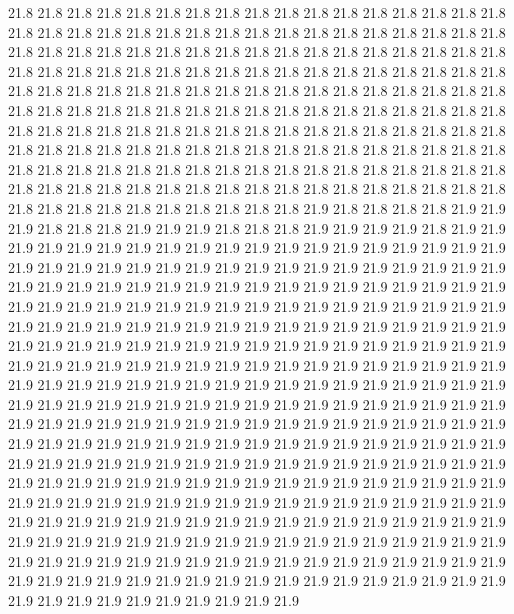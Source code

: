 21.8
21.8
21.8
21.8
21.8
21.8
21.8
21.8
21.8
21.8
21.8
21.8
21.8
21.8
21.8
21.8
21.8
21.8
21.8
21.8
21.8
21.8
21.8
21.8
21.8
21.8
21.8
21.8
21.8
21.8
21.8
21.8
21.8
21.8
21.8
21.8
21.8
21.8
21.8
21.8
21.8
21.8
21.8
21.8
21.8
21.8
21.8
21.8
21.8
21.8
21.8
21.8
21.8
21.8
21.8
21.8
21.8
21.8
21.8
21.8
21.8
21.8
21.8
21.8
21.8
21.8
21.8
21.8
21.8
21.8
21.8
21.8
21.8
21.8
21.8
21.8
21.8
21.8
21.8
21.8
21.8
21.8
21.8
21.8
21.8
21.8
21.8
21.8
21.8
21.8
21.8
21.8
21.8
21.8
21.8
21.8
21.8
21.8
21.8
21.8
21.8
21.8
21.8
21.8
21.8
21.8
21.8
21.8
21.8
21.8
21.8
21.8
21.8
21.8
21.8
21.8
21.8
21.8
21.8
21.8
21.8
21.8
21.8
21.8
21.8
21.8
21.8
21.8
21.8
21.8
21.8
21.8
21.8
21.8
21.8
21.8
21.8
21.8
21.8
21.8
21.8
21.8
21.8
21.8
21.8
21.8
21.8
21.8
21.8
21.8
21.8
21.8
21.8
21.8
21.8
21.8
21.8
21.8
21.8
21.8
21.8
21.8
21.8
21.8
21.8
21.8
21.8
21.8
21.8
21.8
21.8
21.8
21.8
21.8
21.8
21.8
21.8
21.8
21.8
21.8
21.9
21.8
21.8
21.8
21.8
21.9
21.9
21.9
21.8
21.8
21.8
21.9
21.9
21.9
21.8
21.8
21.8
21.9
21.9
21.9
21.9
21.8
21.9
21.9
21.9
21.9
21.9
21.9
21.9
21.9
21.9
21.9
21.9
21.9
21.9
21.9
21.9
21.9
21.9
21.9
21.9
21.9
21.9
21.9
21.9
21.9
21.9
21.9
21.9
21.9
21.9
21.9
21.9
21.9
21.9
21.9
21.9
21.9
21.9
21.9
21.9
21.9
21.9
21.9
21.9
21.9
21.9
21.9
21.9
21.9
21.9
21.9
21.9
21.9
21.9
21.9
21.9
21.9
21.9
21.9
21.9
21.9
21.9
21.9
21.9
21.9
21.9
21.9
21.9
21.9
21.9
21.9
21.9
21.9
21.9
21.9
21.9
21.9
21.9
21.9
21.9
21.9
21.9
21.9
21.9
21.9
21.9
21.9
21.9
21.9
21.9
21.9
21.9
21.9
21.9
21.9
21.9
21.9
21.9
21.9
21.9
21.9
21.9
21.9
21.9
21.9
21.9
21.9
21.9
21.9
21.9
21.9
21.9
21.9
21.9
21.9
21.9
21.9
21.9
21.9
21.9
21.9
21.9
21.9
21.9
21.9
21.9
21.9
21.9
21.9
21.9
21.9
21.9
21.9
21.9
21.9
21.9
21.9
21.9
21.9
21.9
21.9
21.9
21.9
21.9
21.9
21.9
21.9
21.9
21.9
21.9
21.9
21.9
21.9
21.9
21.9
21.9
21.9
21.9
21.9
21.9
21.9
21.9
21.9
21.9
21.9
21.9
21.9
21.9
21.9
21.9
21.9
21.9
21.9
21.9
21.9
21.9
21.9
21.9
21.9
21.9
21.9
21.9
21.9
21.9
21.9
21.9
21.9
21.9
21.9
21.9
21.9
21.9
21.9
21.9
21.9
21.9
21.9
21.9
21.9
21.9
21.9
21.9
21.9
21.9
21.9
21.9
21.9
21.9
21.9
21.9
21.9
21.9
21.9
21.9
21.9
21.9
21.9
21.9
21.9
21.9
21.9
21.9
21.9
21.9
21.9
21.9
21.9
21.9
21.9
21.9
21.9
21.9
21.9
21.9
21.9
21.9
21.9
21.9
21.9
21.9
21.9
21.9
21.9
21.9
21.9
21.9
21.9
21.9
21.9
21.9
21.9
21.9
21.9
21.9
21.9
21.9
21.9
21.9
21.9
21.9
21.9
21.9
21.9
21.9
21.9
21.9
21.9
21.9
21.9
21.9
21.9
21.9
21.9
21.9
21.9
21.9
21.9
21.9
21.9
21.9
21.9
21.9
21.9
21.9
21.9
21.9
21.9
21.9
21.9
21.9
21.9
21.9
21.9
21.9
21.9
21.9
21.9
21.9
21.9
21.9
21.9
21.9
21.9
21.9
21.9
21.9
21.9
21.9
21.9
21.9
21.9
21.9
21.9
21.9
21.9
21.9
21.9
21.9
21.9
